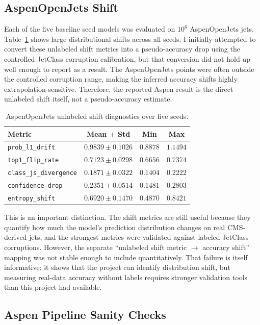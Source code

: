 \subsection{AspenOpenJets Shift}

Each of the five baseline seed models was evaluated on $10^6$ AspenOpenJets jets. Table~\ref{tab:aspen-shift} shows large distributional shifts across all seeds. I initially attempted to convert these unlabeled shift metrics into a pseudo-accuracy drop using the controlled JetClass corruption calibration, but that conversion did not hold up well enough to report as a result. The AspenOpenJets points were often outside the controlled corruption range, making the inferred accuracy shifts highly extrapolation-sensitive. Therefore, the reported Aspen result is the direct unlabeled shift itself, not a pseudo-accuracy estimate.

\begin{table}[t]
\centering
\caption{AspenOpenJets unlabeled shift diagnostics over five seeds.}
\label{tab:aspen-shift}
\begin{tabular}{lccc}
\toprule
Metric & Mean $\pm$ Std & Min & Max \\
\midrule
\texttt{prob\_l1\_drift} & $0.9839 \pm 0.1026$ & $0.8878$ & $1.1494$ \\
\texttt{top1\_flip\_rate} & $0.7123 \pm 0.0298$ & $0.6656$ & $0.7374$ \\
\texttt{class\_js\_divergence} & $0.1871 \pm 0.0322$ & $0.1404$ & $0.2222$ \\
\texttt{confidence\_drop} & $0.2351 \pm 0.0514$ & $0.1481$ & $0.2803$ \\
\texttt{entropy\_shift} & $0.6920 \pm 0.1470$ & $0.4870$ & $0.8421$ \\
\bottomrule
\end{tabular}
\end{table}

This is an important distinction. The shift metrics are still useful because they quantify how much the model's prediction distribution changes on real CMS-derived jets, and the strongest metrics were validated against labeled JetClass corruptions. However, the separate ``unlabeled shift metric $\rightarrow$ accuracy shift'' mapping was not stable enough to include quantitatively. That failure is itself informative: it shows that the project can identify distribution shift, but measuring real-data accuracy without labels requires stronger validation tools than this project had available.

\subsection{Aspen Pipeline Sanity Checks}

